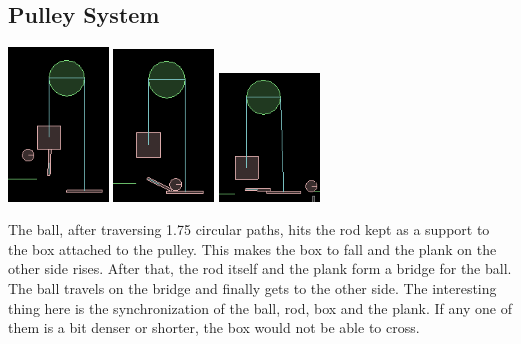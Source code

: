\documentclass[11pt]{article}
\begin{document}
\subsection{Pulley System}
\begin{center}
\includegraphics[width=0.2\textwidth,height=0.2\textheight]{img/pulley1} 
\hspace{2em}
\includegraphics[width=0.2\textwidth,height=0.2\textheight]{img/pulley2}
\hspace{2em}
\includegraphics[width=0.2\textwidth,height=0.2\textheight]{img/pulley3}
\end{center}
The ball, after traversing 1.75 circular paths, hits the rod kept as a support to the box attached to the pulley.
This makes the box to fall and the plank on the other side rises. After that, the rod itself and the plank form a bridge for the ball. The ball travels on the bridge and finally gets to the other side. The interesting thing here is the synchronization of the ball, rod, box and the plank. If any one of them is a bit denser or shorter, the box would not be able to cross.
\end{document}
